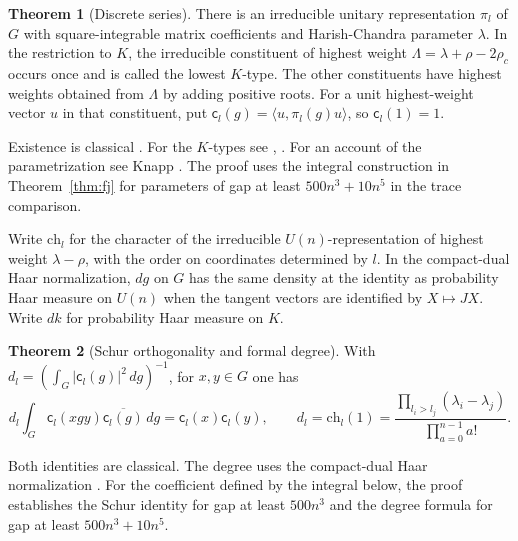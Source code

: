 \documentclass[reqno]{amsart}
\theoremstyle{definition}
\newtheorem{theorem}{Theorem}
\newcommand{\cc}{\mathsf c}
\newcommand{\ch}{\mathrm{ch}}
\begin{document}
\begin{theorem}[Discrete series]\label{thm:ds}
There is an irreducible unitary representation \(\pi_l\) of \(G\) with square-integrable matrix coefficients and Harish-Chandra parameter \(\lambda\). In the restriction to \(K\), the irreducible constituent of highest weight \(\Lambda=\lambda+\rho-2\rho_c\) occurs once and is called the lowest \(K\)-type. The other constituents have highest weights obtained from \(\Lambda\) by adding positive roots. For a unit highest-weight vector \(u\) in that constituent, put \(\cc_l(g)=\langle u,\pi_l(g)u\rangle\), so \(\cc_l(1)=1\).
\end{theorem}

\noindent Existence is classical \cite[Theorem~16]{HC}. For the \(K\)-types see \cite[Theorem~(8.5)]{AS}, \cite[\S2.2]{BV}. For an account of the parametrization see Knapp \cite{Knapp}. The proof uses the integral construction in Theorem~\ref{thm:fj} for parameters of gap at least \(500n^3+10n^5\) in the trace comparison.

Write \(\ch_l\) for the character of the irreducible \(U(n)\)-representation of highest weight \(\lambda-\rho\), with the order on coordinates determined by \(l\). In the compact-dual Haar normalization, \(dg\) on \(G\) has the same density at the identity as probability Haar measure on \(U(n)\) when the tangent vectors are identified by \(X\mapsto JX\). Write \(dk\) for probability Haar measure on \(K\).

\begin{theorem}[Schur orthogonality and formal degree]\label{thm:schur}\label{thm:degree}
With \(d_l=(\int_G|\cc_l(g)|^2\,dg)^{-1}\), for \(x,y\in G\) one has
\[
 d_l\int_G \cc_l(xgy)\overline{\cc_l(g)}\,dg=\cc_l(x)\cc_l(y),
 \qquad
 d_l=\ch_l(1)=
 \frac{\prod_{l_i>l_j}(\lambda_i-\lambda_j)}{\prod_{a=0}^{n-1}a!}.
\]
\end{theorem}

\noindent Both identities are classical. The degree uses the compact-dual Haar normalization \cite[Theorem~(8.1)]{AS}. For the coefficient defined by the integral below, the proof establishes the Schur identity for gap at least \(500n^3\) and the degree formula for gap at least \(500n^3+10n^5\).
\end{document}

